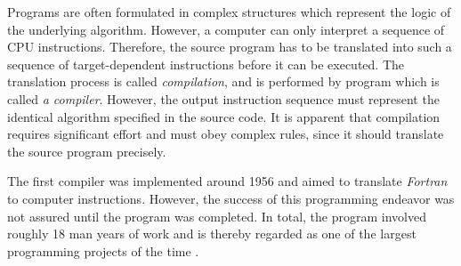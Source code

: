 Programs are often formulated in complex structures which represent the logic of the underlying algorithm.
However, a computer can only interpret a sequence of CPU instructions.
Therefore, the source program has to be translated into such a sequence of target-dependent instructions before it can be executed.
The translation process is called \emph{compilation}, and is performed by program which is called \emph{a compiler}.
However, the output instruction sequence must represent the identical algorithm specified in the source code.
It is apparent that compilation requires significant effort and must obey complex rules,
since it should translate the source program precisely.

The first compiler was implemented around 1956 and aimed to translate \emph{Fortran} to computer instructions.
However, the success of this programming endeavor was not assured until the program was completed.
In total, the program involved roughly 18 man years of work
and is thereby regarded as one of the largest programming projects of the time  \cite[p.~6]{wirth_compiler_construction_2005}.
